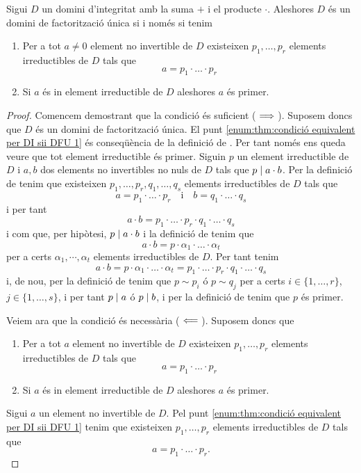 \documentclass[../Apunts.tex]{subfiles}
\begin{document}
	\begin{theorem}
		\label{thm:condició equivalent per DI sii DFU}
		Sigui \(D\) un domini d'integritat amb la suma \(+\) i el producte \(\cdot\). Aleshores \(D\) és un domini de factorització única si i només si tenim
		\begin{enumerate}
			\item\label{enum:thm:condició equivalent per DI sii DFU 1} Per a tot \(a\neq0\) element no invertible de \(D\) existeixen \(p_{1},\dots,p_{r}\) elements irreductibles de \(D\) tals que
			\[a=p_{1}\cdot\ldots\cdot p_{r}\]
			\item\label{enum:thm:condició equivalent per DI sii DFU 2} Si \(a\) és in element irreductible de \(D\) aleshores \(a\) és primer.
		\end{enumerate}
		\begin{proof}
			Comencem demostrant que la condició és suficient (\(\implies\)). Suposem doncs que \(D\) és un domini de factorització única. El punt \eqref{enum:thm:condició equivalent per DI sii DFU 1} és conseqüència de la definició de . Per tant només ens queda veure que tot element irreductible és primer. Siguin \(p\) un element irreductible de \(D\) i \(a,b\) dos elements no invertibles no nuls de \(D\) tals que \(p\mathrel{|} a\cdot b\). Per la definició de  tenim que existeixen \(p_{1},\dots,p_{r},q_{1},\dots,q_{s}\) elements irreductibles de \(D\) tals que
			\[a=p_{1}\cdot\ldots\cdot p_{r}\quad\text{i}\quad b=q_{1}\cdot\ldots\cdot q_{s}\]
			i per tant
			\[a\cdot b=p_{1}\cdot\ldots\cdot p_{r}\cdot q_{1}\cdot\ldots\cdot q_{s}\]
			i com que, per hipòtesi, \(p\mathrel{|} a\cdot b\) i la definició de  tenim que
			\[a\cdot b=p\cdot\alpha_{1}\cdot\ldots\cdot\alpha_{t}\]
			per a certs \(\alpha_{1},\cdots,\alpha_{t}\) elements irreductibles de \(D\). Per tant tenim
			\[a\cdot b=p\cdot\alpha_{1}\cdot\ldots\cdot\alpha_{t}=p_{1}\cdot\ldots\cdot p_{r}\cdot q_{1}\cdot\ldots\cdot q_{s}\]
			i, de nou, per la definició de  tenim que \(p\sim p_{i}\) ó \(p\sim q_{j}\) per a certs \(i\in\{1,\dots,r\}\), \(j\in\{1,\dots,s\}\), i per tant \(p\mathrel{|} a\) ó \(p\mathrel{|} b\), i per la definició de  tenim que \(p\) és primer.
			
			Veiem ara que la condició és necessària (\(\impliedby\)). Suposem doncs que
			\begin{enumerate}
				\item Per a tot \(a\) element no invertible de \(D\) existeixen \(p_{1},\dots,p_{r}\) elements irreductibles de \(D\) tals que
				\[a=p_{1}\cdot\ldots\cdot p_{r}\]
				\item Si \(a\) és in element irreductible de \(D\) aleshores \(a\) és primer.
			\end{enumerate}
			Sigui \(a\) un element no invertible de \(D\). Pel punt \eqref{enum:thm:condició equivalent per DI sii DFU 1} tenim que existeixen \(p_{1},\dots,p_{r}\) elements irreductibles de \(D\) tals que
			\[a=p_{1}\cdot\ldots\cdot p_{r}.\]
			

\end{proof}
\end{theorem}
\end{document}
